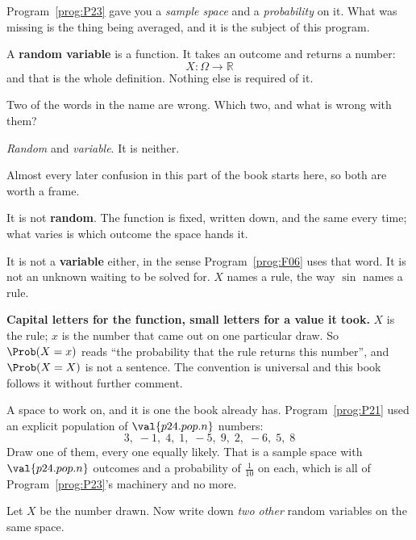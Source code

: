 \begin{fr}

Program~\ref{prog:P23} gave you a \emph{sample space} and a \emph{probability}
on it. What was missing is the thing being averaged, and it is the subject of
this program.

A \textbf{random variable} is a function. It takes an outcome and returns a
number:
\[ X \colon \Omega \longrightarrow \mathbb{R} \]
and that is the whole definition. Nothing else is required of it.

Two of the words in the name are wrong. Which two, and what is wrong with
them?
\dotline
\nextframe
\end{fr}

\begin{fr}
\begin{ansblock}
\emph{Random} and \emph{variable}. It is neither.
\end{ansblock}

Almost every later confusion in this part of the book starts here, so both are
worth a frame.

It is not \textbf{random}. The function is fixed, written down, and the same
every time; what varies is which outcome the space hands it.

It is not a \textbf{variable} either, in the sense Program~\ref{prog:F06} uses
that word. It is not an unknown waiting to be solved for. $X$ names a rule,
the way $\sin$ names a rule.

\begin{notationbox}
\textbf{Capital letters for the function, small letters for a value it took.}
$X$ is the rule; $x$ is the number that came out on one particular draw. So
$\Prob(X = x)$ reads \enquote{the probability that the rule returns this
number}, and $\Prob(X = X)$ is not a sentence. The convention is universal and
this book follows it without further comment.
\end{notationbox}
\end{fr}

\begin{fr}
A space to work on, and it is one the book already has.
Program~\ref{prog:P21} used an explicit population of
$\val{p24.pop.n}$ numbers:
\[ 3,\; -1,\; 4,\; 1,\; -5,\; 9,\; 2,\; -6,\; 5,\; 8 \]
Draw one of them, every one equally likely. That is a sample space with
$\val{p24.pop.n}$ outcomes and a probability of $\frac{1}{10}$ on each, which
is all of Program~\ref{prog:P23}'s machinery and no more.

Let $X$ be the number drawn. Now write down \emph{two other} random variables
on the same space.
\dotline
\nextframe
\end{fr}

